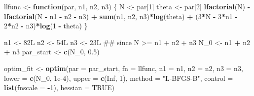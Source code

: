 \documentclass[]{article}
\newenvironment{Shaded}{\begin{snugshade}}{\end{snugshade}}
\newcommand{\KeywordTok}[1]{\textcolor[rgb]{0.13,0.29,0.53}{\textbf{#1}}}
\newcommand{\DataTypeTok}[1]{\textcolor[rgb]{0.13,0.29,0.53}{#1}}
\newcommand{\DecValTok}[1]{\textcolor[rgb]{0.00,0.00,0.81}{#1}}
\newcommand{\FloatTok}[1]{\textcolor[rgb]{0.00,0.00,0.81}{#1}}
\newcommand{\StringTok}[1]{\textcolor[rgb]{0.31,0.60,0.02}{#1}}
\newcommand{\OtherTok}[1]{\textcolor[rgb]{0.56,0.35,0.01}{#1}}
\newcommand{\ControlFlowTok}[1]{\textcolor[rgb]{0.13,0.29,0.53}{\textbf{#1}}}
\newcommand{\OperatorTok}[1]{\textcolor[rgb]{0.81,0.36,0.00}{\textbf{#1}}}
\newcommand{\NormalTok}[1]{#1}
\begin{document}
\begin{Shaded}
\begin{Highlighting}[]
\NormalTok{llfunc <-}\StringTok{ }\ControlFlowTok{function}\NormalTok{(par, n1, n2, n3) \{}
\NormalTok{  N <-}\StringTok{ }\NormalTok{par[}\DecValTok{1}\NormalTok{]}
\NormalTok{  theta <-}\StringTok{ }\NormalTok{par[}\DecValTok{2}\NormalTok{]}
  \KeywordTok{lfactorial}\NormalTok{(N) }\OperatorTok{-}\StringTok{ }\KeywordTok{lfactorial}\NormalTok{(N }\OperatorTok{-}\StringTok{ }\NormalTok{n1 }\OperatorTok{-}\StringTok{ }\NormalTok{n2 }\OperatorTok{-}\StringTok{ }\NormalTok{n3) }\OperatorTok{+}
\StringTok{    }\KeywordTok{sum}\NormalTok{(n1, n2, n3)}\OperatorTok{*}\KeywordTok{log}\NormalTok{(theta) }\OperatorTok{+}\StringTok{ }
\StringTok{    }\NormalTok{(}\DecValTok{3}\OperatorTok{*}\NormalTok{N }\OperatorTok{-}\StringTok{ }\DecValTok{3}\OperatorTok{*}\NormalTok{n1 }\OperatorTok{-}\StringTok{ }\DecValTok{2}\OperatorTok{*}\NormalTok{n2 }\OperatorTok{-}\StringTok{ }\NormalTok{n3)}\OperatorTok{*}\KeywordTok{log}\NormalTok{(}\DecValTok{1} \OperatorTok{-}\StringTok{ }\NormalTok{theta)}
\NormalTok{\}}

\NormalTok{n1 <-}\StringTok{ }\NormalTok{82L}
\NormalTok{n2 <-}\StringTok{ }\NormalTok{54L}
\NormalTok{n3 <-}\StringTok{ }\NormalTok{23L}
\NormalTok{## since N >= n1 + n2 + n3}
\NormalTok{N_}\DecValTok{0}\NormalTok{ <-}\StringTok{ }\NormalTok{n1 }\OperatorTok{+}\StringTok{ }\NormalTok{n2 }\OperatorTok{+}\StringTok{ }\NormalTok{n3}
\NormalTok{par_start <-}\StringTok{ }\KeywordTok{c}\NormalTok{(N_}\DecValTok{0}\NormalTok{, }\FloatTok{0.5}\NormalTok{)}

\NormalTok{optim_fit <-}\StringTok{ }\KeywordTok{optim}\NormalTok{(}\DataTypeTok{par =}\NormalTok{ par_start,}
                   \DataTypeTok{fn =}\NormalTok{ llfunc,}
                   \DataTypeTok{n1 =}\NormalTok{ n1, }\DataTypeTok{n2 =}\NormalTok{ n2, }\DataTypeTok{n3 =}\NormalTok{ n3,}
                   \DataTypeTok{lower =} \KeywordTok{c}\NormalTok{(N_}\DecValTok{0}\NormalTok{, }\FloatTok{1e-4}\NormalTok{),}
                   \DataTypeTok{upper =} \KeywordTok{c}\NormalTok{(}\OtherTok{Inf}\NormalTok{, }\DecValTok{1}\NormalTok{),}
                   \DataTypeTok{method =} \StringTok{"L-BFGS-B"}\NormalTok{,}
                   \DataTypeTok{control =} \KeywordTok{list}\NormalTok{(}\DataTypeTok{fnscale =} \OperatorTok{-}\DecValTok{1}\NormalTok{),}
                   \DataTypeTok{hessian =} \OtherTok{TRUE}\NormalTok{)}


\end{Highlighting}
\end{Shaded}
\end{document}
